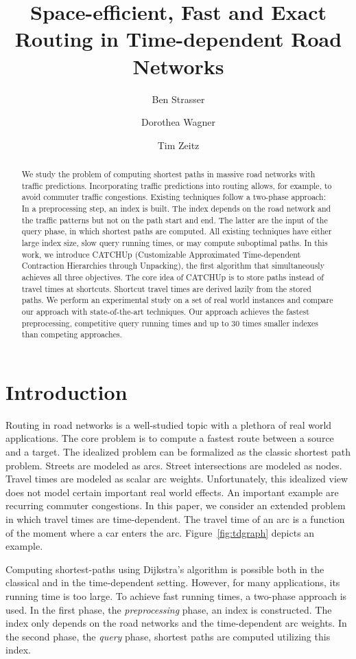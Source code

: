 \documentclass[a4paper,UKenglish,cleveref,autoref]{lipics-v2019}
\author{Ben Strasser}{Karlsruhe Institute of Technology, Germany}{academia@ben-strasser.net}{}{}
\author{Dorothea Wagner}{Karlsruhe Institute of Technology, Germany}{dorothea.wagner@kit.edu}{}{}
\author{Tim Zeitz}{Karlsruhe Institute of Technology, Germany}{tim.zeitz@kit.edu}{https://orcid.org/0000-0003-4746-3582}{}
\title{Space-efficient, Fast and Exact Routing in Time-dependent Road Networks}
\newcommand{\tdcch}{CATCHUp}
\begin{document}
\maketitle

\begin{abstract}
We study the problem of computing shortest paths in massive road networks with traffic predictions.
Incorporating traffic predictions into routing allows, for example, to avoid commuter traffic congestions.
Existing techniques follow a two-phase approach:
In a preprocessing step, an index is built.
The index depends on the road network and the traffic patterns but not on the path start and end.
The latter are the input of the query phase, in which shortest paths are computed.
All existing techniques have either large index size, slow query running times, or may compute suboptimal paths.
In this work, we introduce \tdcch{} (Customizable Approximated Time-dependent Contraction Hierarchies through Unpacking), the first algorithm that simultaneously achieves all three objectives.
The core idea of \tdcch{} is to store paths instead of travel times at shortcuts.
Shortcut travel times are derived lazily from the stored paths.
We perform an experimental study on a set of real world instances and compare our approach with state-of-the-art techniques.
Our approach achieves the fastest preprocessing, competitive query running times and up to 30 times smaller indexes than competing approaches.
\end{abstract}

\newpage

\section{Introduction}
Routing in road networks is a well-studied topic with a plethora of real world applications.
The core problem is to compute a fastest route between a source and a target.
The idealized problem can be formalized as the classic shortest path problem.
Streets are modeled as arcs.
Street intersections are modeled as nodes.
Travel times are modeled as scalar arc weights.
Unfortunately, this idealized view does not model certain important real world effects.
An important example are recurring commuter congestions.
In this paper, we consider an extended problem in which travel times are time-dependent.
The travel time of an arc is a function of the moment where a car enters the arc.
Figure~\ref{fig:tdgraph} depicts an example.

Computing shortest-paths using Dijkstra's \cite{d-ntpcg-59} algorithm is possible both in the classical and in the time-dependent setting.
However, for many applications, its running time is too large.
To achieve fast running times, a two-phase approach is used.
In the first phase, the \emph{preprocessing} phase, an index is constructed.
The index only depends on the road networks and the time-dependent arc weights.
In the second phase, the \emph{query} phase, shortest paths are computed utilizing this index.
\end{document}

